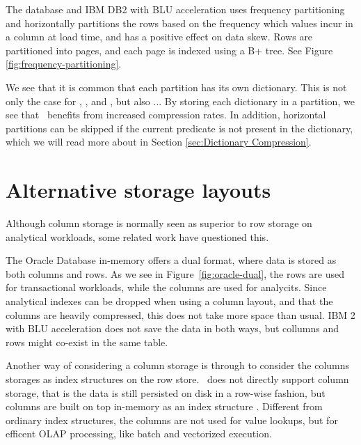 The  database and IBM DB2 with BLU acceleration  \cite{Barber2012-xt, Raman2013-em, Raman2008-gi} uses frequency partitioning and horizontally partitions the rows based on the frequency which values incur in a column at load time, and has a positive effect on data skew. Rows are partitioned into pages, and each page is indexed using a B+ tree. See Figure \ref{fig:frequency-partitioning}.

We see that it is common that each partition has its own dictionary. This is not only the case for \mssql, \oracle, and \blink, but also ... By storing each dictionary in a partition, we see that \blink~benefits from increased compression rates. In addition, horizontal partitions can be skipped if the current predicate is not present in the dictionary, which we will read more about in Section \ref{sec:Dictionary Compression}.

\section{Alternative storage layouts}
\label{sec:Alternative storage layouts}
Although column storage is normally seen as superior to row storage on analytical workloads, some related work have questioned this.

The Oracle Database in-memory \cite{Lahiri2015-mz} offers a dual format, where data is stored as both columns and rows. As we see in Figure~\ref{fig:oracle-dual}, the rows are used for transactional workloads, while the columns are used for analycits. Since analytical indexes can be dropped when using a column layout, and that the columns are heavily compressed, this does not take more space than usual. IBM 2 with BLU acceleration \cite{Raman2013-em} does not save the data in both ways, but collumns and rows might co-exist in the same table.

Another way of considering a column storage is through to consider the columns storages as index structures on the row store. \mssql~does not directly support column storage, that is the data is still persisted on disk in a row-wise fashion, but columns are built on top in-memory as an index structure \cite{noauthor_undated-vq}. Different from ordinary index structures, the columns are not used for value lookups, but for efficent OLAP processing, like batch and vectorized execution. 

